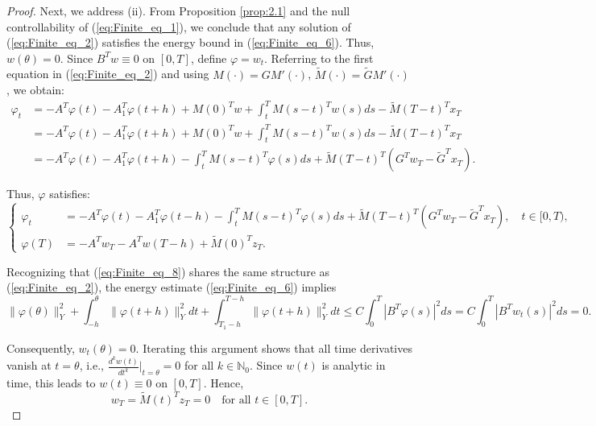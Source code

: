 \documentclass[12pt]{article}
\theoremstyle{plain}
\theoremstyle{definition}
\begin{document}
\begin{proof}
Next, we address (ii). From Proposition \ref{prop:2.1} and the null controllability of (\ref{eq:Finite_eq_1}), we conclude that any solution of (\ref{eq:Finite_eq_2}) satisfies the energy bound in (\ref{eq:Finite_eq_6}). Thus, \( w(\theta) = 0 \). Since \( B^T w \equiv 0 \) on \( [0,T] \), define \( \varphi = w_t \). Referring to the first equation in (\ref{eq:Finite_eq_2}) and using \( M(\cdot) = G M'(\cdot) \), \( \widetilde{M}(\cdot) = \widetilde{G} M'(\cdot) \), we obtain:
\begin{align*}
\varphi_t &= -A^T \varphi(t)-A_1^T \varphi(t+h) + M(0)^T w + \int_t^T M(s - t)^T w(s)ds - \widetilde{M}(T - t)^T x_T \\
&= -A^T \varphi (t)-A_1^T \varphi(t+h) + M(0)^T w + \int_t^T M(s - t)^T w(s)ds - \widetilde{M}(T - t)^T x_T \\
&= -A^T \varphi(t)-A_1^T \varphi(t+h) - \int_t^T M(s - t)^T \varphi(s)ds + \widetilde{M}(T - t)^T (G^T w_T - \widetilde{G}^T x_T).
\end{align*}

Thus, \( \varphi \) satisfies:
\begin{equation}
\label{eq:Finite_eq_8}
\left\{
\begin{aligned}
\varphi_t &= -A^T \varphi(t)-A_1^T \varphi(t-h) - \int_t^T M(s - t)^T \varphi(s)ds + \widetilde{M}(T - t)^T (G^T w_T - \widetilde{G}^T x_T), \quad t \in [0, T), \\
\varphi(T) &= -A^T w_T-A^T w(T-h) + \widetilde{M}(0)^T z_T.
\end{aligned}
\right.
\end{equation}

Recognizing that (\ref{eq:Finite_eq_8}) shares the same structure as (\ref{eq:Finite_eq_2}), the energy estimate (\ref{eq:Finite_eq_6}) implies
\begin{equation}
\label{eq:Finite_eq_9}
 \|\varphi(\theta)\|_Y^2 + \int_{ - h}^{\theta} \|\varphi(t+h)\|_Y^2 dt+ \int_{T_1 - h}^{T-h} \|\varphi(t+h)\|_Y^2 dt \leq C \int_0^T |B^T \varphi(s)|^2 ds = C \int_0^T |B^T w_t(s)|^2 ds = 0.
\end{equation}

Consequently, \( w_t(\theta) = 0 \). Iterating this argument shows that all time derivatives vanish at \( t = \theta \), i.e., \( \frac{d^k w(t)}{dt^k}\big|_{t=\theta} = 0 \) for all \( k \in \mathbb{N}_0 \). Since \( w(t) \) is analytic in time, this leads to \( w(t) \equiv 0 \) on \( [0,T] \). Hence,
\[
w_T = \widetilde{M}(t)^T z_T = 0 \quad \text{for all } t \in [0, T].
\]
\end{proof}
\end{document}

